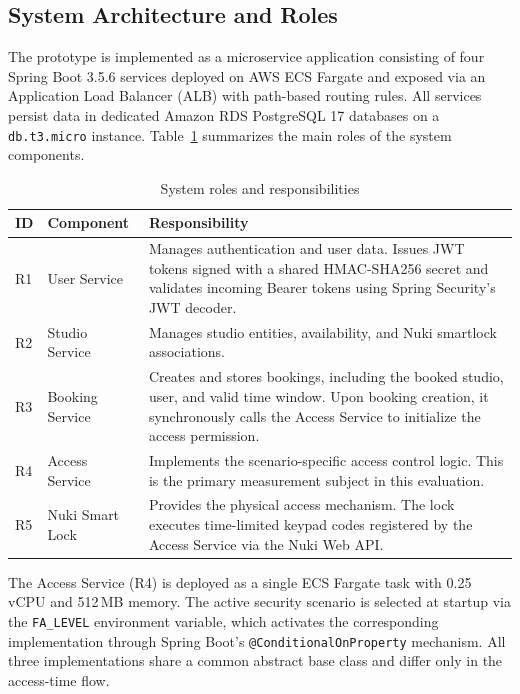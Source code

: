 \subsection{System Architecture and Roles}

The prototype is implemented as a microservice application consisting of four Spring Boot 3.5.6 services deployed on AWS ECS Fargate and exposed via an Application Load Balancer (ALB) with path-based routing rules. All services persist data in dedicated Amazon RDS PostgreSQL 17 databases on a \texttt{db.t3.micro} instance. Table~\ref{tab:responsibilities} summarizes the main roles of the system components.

\begin{table}[H]
\centering
\caption{System roles and responsibilities}
\label{tab:responsibilities}
\begin{tabular}{p{1.2cm}p{3.2cm}p{8.0cm}}
\hline
\textbf{ID} & \textbf{Component} & \textbf{Responsibility} \\
\hline
R1 & User Service      & Manages authentication and user data. Issues JWT tokens signed with a shared HMAC-SHA256 secret and validates incoming Bearer tokens using Spring Security's JWT decoder. \\
R2 & Studio Service    & Manages studio entities, availability, and Nuki smartlock associations. \\
R3 & Booking Service   & Creates and stores bookings, including the booked studio, user, and valid time window. Upon booking creation, it synchronously calls the Access Service to initialize the access permission. \\
R4 & Access Service    & Implements the scenario-specific access control logic. This is the primary measurement subject in this evaluation. \\
R5 & Nuki Smart Lock   & Provides the physical access mechanism. The lock executes time-limited keypad codes registered by the Access Service via the Nuki Web API. \\
\hline
\end{tabular}
\end{table}

The Access Service (R4) is deployed as a single ECS Fargate task with 0.25 vCPU and 512\,MB memory. The active security scenario is selected at startup via the \texttt{FA\_LEVEL} environment variable, which activates the corresponding implementation through Spring Boot's \texttt{@ConditionalOnProperty} mechanism. All three implementations share a common abstract base class and differ only in the access-time flow.

